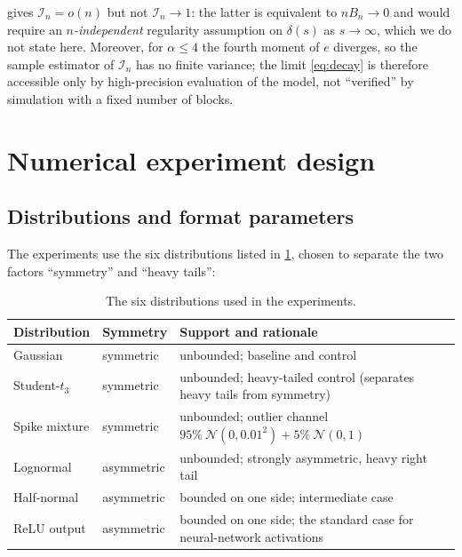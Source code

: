 \documentclass[review,hidelinks,oneeqnum,onetabnum,onefignum,onethmnum]{siamart251216}
\begin{document}
\begin{remark}
 gives $\mathcal I_n=o(n)$ but not $\mathcal I_n\to1$: the latter
is equivalent to $nB_n\to0$ and would require an \emph{$n$-independent}
regularity assumption on $\delta(s)$ as $s\to\infty$, which we do not state here.
Moreover, for $\alpha\le4$ the fourth moment of $e$ diverges, so the sample
estimator of $\mathcal I_n$ has no finite variance; the limit \cref{eq:decay} is
therefore accessible only by high-precision evaluation of the model, not
``verified'' by simulation with a fixed number of blocks.
\end{remark}

\section{Numerical experiment design}
\label{sec:methods}

\subsection{Distributions and format parameters}

The experiments use the six distributions listed in \cref{tab:dists}, chosen to
separate the two factors ``symmetry'' and ``heavy tails'':

\begin{table}[!tb]
\centering
\caption{The six distributions used in the experiments.}
\label{tab:dists}
\small
\begin{tabular}{@{}llp{}@{}}
\toprule
Distribution & Symmetry & Support and rationale \\
\midrule
Gaussian & symmetric & unbounded; baseline and control \\
Student-$t_3$ & symmetric & unbounded; heavy-tailed control (separates heavy tails from symmetry)\\
Spike mixture & symmetric & unbounded; outlier channel $95\%\ \mathcal N(0,0.01^2)+5\%\ \mathcal N(0,1)$ \\
Lognormal & asymmetric & unbounded; strongly asymmetric, heavy right tail \\
Half-normal & asymmetric & bounded on one side; intermediate case \\
ReLU output & asymmetric & bounded on one side; the standard case for neural-network activations \\
\bottomrule
\end{tabular}
\end{table}
\end{document}
